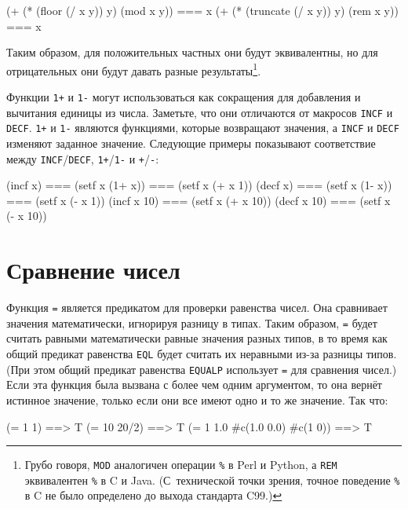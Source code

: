 \begin{myverb}
(+ (* (floor    (/ x y)) y) (mod x y)) === x
(+ (* (truncate (/ x y)) y) (rem x y)) === x
\end{myverb}

Таким образом, для положительных частных они будут эквивалентны, но для отрицательных они
будут давать разные результаты\footnote{Грубо говоря, \lstinline{MOD} аналогичен операции
  \lstinline{%} в Perl и Python, а \lstinline{REM} эквивалентен \lstinline{%} в C и
  Java. (С~технической точки зрения, точное поведение \lstinline{%} в C не было определено до
  выхода стандарта C99.)}\hspace{\footnotenegspace}.

Функции \lstinline{1+} и \lstinline{1-} могут использоваться как сокращения для добавления и
вычитания единицы из числа.  Заметьте, что они отличаются от макросов \lstinline{INCF} и
\lstinline{DECF}.  \lstinline{1+} и \lstinline{1-} являются функциями, которые возвращают значения, а
\lstinline{INCF} и \lstinline{DECF} изменяют заданное значение.  Следующие примеры показывают
соответствие между \lstinline{INCF}/\lstinline{DECF}, \lstinline{1+}/\lstinline{1-} и \lstinline{+}/\lstinline{-}:

\begin{myverb}
(incf x)    === (setf x (1+ x)) === (setf x (+ x 1))
(decf x)    === (setf x (1- x)) === (setf x (- x 1))
(incf x 10) === (setf x (+ x 10))
(decf x 10) === (setf x (- x 10))
\end{myverb}

\section{Сравнение чисел}

Функция \lstinline{=} является предикатом для проверки равенства чисел.  Она сравнивает
значения математически, игнорируя разницу в типах.  Таким образом, \lstinline{=} будет считать
равными математически равные значения разных типов, в то время как общий предикат
равенства \lstinline{EQL} будет считать их неравными из-за разницы типов. (При этом общий
предикат равенства \lstinline{EQUALP} использует \lstinline{=} для сравнения чисел.)  Если эта
функция была вызвана с более чем одним аргументом, то она вернёт истинное значение, только
если они все имеют одно и то же значение. Так что:

\begin{myverb}
(= 1 1)                        ==> T
(= 10 20/2)                    ==> T
(= 1 1.0 #c(1.0 0.0) #c(1 0))  ==> T
\end{myverb}

